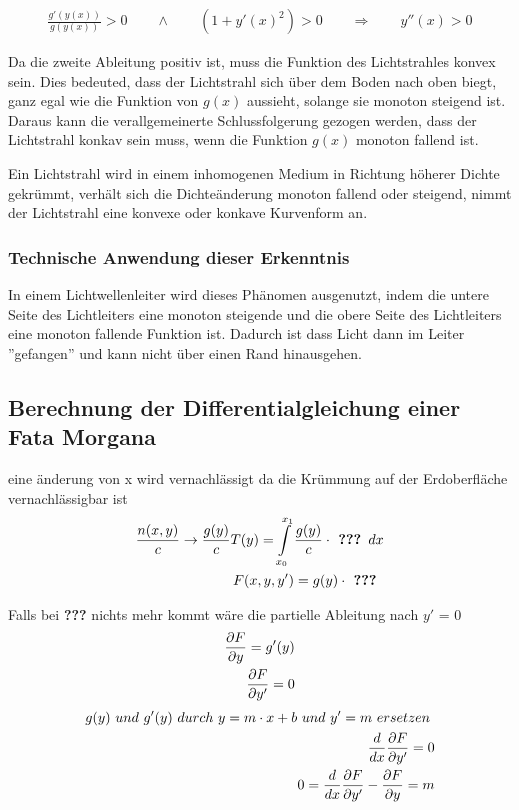 \begin{align}
	\frac{g'(y(x))}{g(y(x))} > 0 \qquad \wedge \qquad (1 + y'(x)^2) > 0 \qquad \Rightarrow \qquad y''(x) > 0
	\label{krümmungAuswertung}
\end{align}

Da die zweite Ableitung positiv ist, muss die Funktion des Lichtstrahles konvex sein.
Dies bedeuted, dass der Lichtstrahl sich über dem Boden nach oben biegt, ganz egal wie die Funktion von $g(x)$ aussieht, solange sie monoton steigend ist.
Daraus kann die verallgemeinerte Schlussfolgerung gezogen werden, dass der Lichtstrahl konkav sein muss, wenn die Funktion $g(x)$ monoton fallend ist.
\begin{definition}
Ein Lichtstrahl wird in einem inhomogenen Medium in Richtung höherer Dichte gekrümmt, verhält sich die Dichteänderung monoton fallend oder steigend, nimmt der Lichtstrahl eine konvexe oder konkave Kurvenform an.
\end{definition}

\subsubsection{Technische Anwendung dieser Erkenntnis}
In einem Lichtwellenleiter wird dieses Phänomen ausgenutzt, indem die untere Seite des Lichtleiters eine monoton steigende
und die obere Seite des Lichtleiters eine monoton fallende Funktion ist. 
Dadurch ist dass Licht dann im Leiter ''gefangen'' und kann nicht über einen Rand hinausgehen.

\subsection{Berechnung der Differentialgleichung einer Fata Morgana}

eine änderung von x wird vernachlässigt da die Krümmung auf der Erdoberfläche vernachlässigbar ist
\begin{align}
\frac{n(x,y)}{c} \rightarrow \frac{g(y)}{c}
T(y) = \int \limits_{x_0}^{x_1} \frac{g(y)}{c} \cdot \textbf{ ??? } dx \notag \\
F(x,y,y') = g(y) \cdot \textbf{ ??? } \notag
\end{align}

Falls bei \textbf{???} nichts mehr kommt wäre die partielle Ableitung nach $y'$ = 0
\begin{align}
\frac{\partial F}{\partial y} = g'(y)\notag \\
\frac{\partial F}{\partial y'} = 0 \notag 
\end{align}
\begin{align}
g(y) \  und \ g'(y) \ durch \ y = m\cdot x + b \ und \ y' = m \ ersetzen \ \notag \\
\frac{d}{dx} \frac{\partial F}{\partial y'} = 0 \notag \\
	0 = \frac{d}{dx} \frac{\partial F}{\partial y'} - \frac{\partial F}{\partial y} = m
\end{align}

